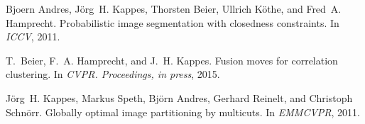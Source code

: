 
\begin{DoxyDescription}
\item[\label{_CITEREF_andres_2011_probabilistic}%
\mbox{[}1\mbox{]}]Bjoern Andres, J\"{o}rg~H. Kappes, Thorsten Beier, Ullrich K\"{o}the, and Fred~A. Hamprecht. Probabilistic image segmentation with closedness constraints. In {\itshape I\+C\+CV}, 2011.


\item[\label{_CITEREF_beier_15_funsion}%
\mbox{[}2\mbox{]}]T.~Beier, F.~A. Hamprecht, and J.~H. Kappes. Fusion moves for correlation clustering. In {\itshape C\+V\+PR. Proceedings, in press}, 2015.


\item[\label{_CITEREF_Kappes-2011}%
\mbox{[}3\mbox{]}]J\"{o}rg~H. Kappes, Markus Speth, Bj\"{o}rn Andres, Gerhard Reinelt, and Christoph Schn\"{o}rr. Globally optimal image partitioning by multicuts. In {\itshape E\+M\+M\+C\+V\+PR}, 2011.


\end{DoxyDescription}